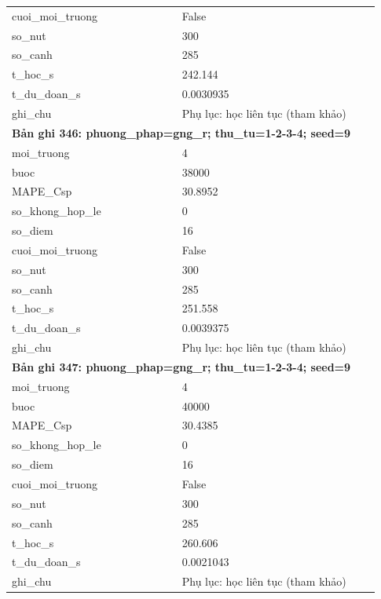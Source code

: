 \begin{longtable}{p{0.43\linewidth}p{0.50\linewidth}}
cuoi\_\allowbreak moi\_\allowbreak truong & False \\
so\_\allowbreak nut & 300 \\
so\_\allowbreak canh & 285 \\
t\_\allowbreak hoc\_\allowbreak s & 242.144 \\
t\_\allowbreak du\_\allowbreak doan\_\allowbreak s & 0.0030935 \\
ghi\_\allowbreak chu & Phụ lục: học liên tục (tham khảo) \\
\midrule
\multicolumn{2}{p{0.95\linewidth}}{\textbf{Bản ghi 346: phuong\_phap=gng\_r; thu\_tu=1-2-3-4; seed=9}} \\
moi\_\allowbreak truong & 4 \\
buoc & 38000 \\
MAPE\_\allowbreak Csp & 30.8952 \\
so\_\allowbreak khong\_\allowbreak hop\_\allowbreak le & 0 \\
so\_\allowbreak diem & 16 \\
cuoi\_\allowbreak moi\_\allowbreak truong & False \\
so\_\allowbreak nut & 300 \\
so\_\allowbreak canh & 285 \\
t\_\allowbreak hoc\_\allowbreak s & 251.558 \\
t\_\allowbreak du\_\allowbreak doan\_\allowbreak s & 0.0039375 \\
ghi\_\allowbreak chu & Phụ lục: học liên tục (tham khảo) \\
\midrule
\multicolumn{2}{p{0.95\linewidth}}{\textbf{Bản ghi 347: phuong\_phap=gng\_r; thu\_tu=1-2-3-4; seed=9}} \\
moi\_\allowbreak truong & 4 \\
buoc & 40000 \\
MAPE\_\allowbreak Csp & 30.4385 \\
so\_\allowbreak khong\_\allowbreak hop\_\allowbreak le & 0 \\
so\_\allowbreak diem & 16 \\
cuoi\_\allowbreak moi\_\allowbreak truong & False \\
so\_\allowbreak nut & 300 \\
so\_\allowbreak canh & 285 \\
t\_\allowbreak hoc\_\allowbreak s & 260.606 \\
t\_\allowbreak du\_\allowbreak doan\_\allowbreak s & 0.0021043 \\
ghi\_\allowbreak chu & Phụ lục: học liên tục (tham khảo) \\

\end{longtable}
